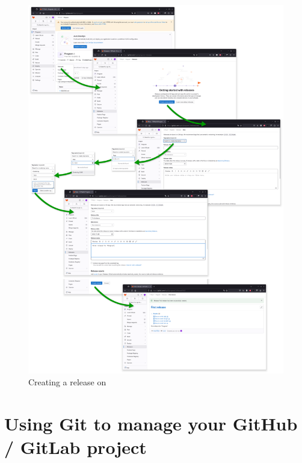\begin{figure}[!p]
\includegraphics[width=1.0\textwidth,keepaspectratio=true,draft=\ddst]{img/hosts/gitlab/release.eps} 
\caption{Creating a release on \gitlab\label{rgitlab}}
\end{figure}

\clearpage

\section{Using Git to manage your GitHub / GitLab project}
\label{onlinegit}

